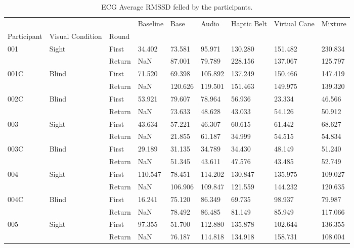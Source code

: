 
\begin{table}[!htb]
\centering
\caption{ECG Average RMSSD felled by the participants.}
\label{tab:ecg_rmssd_table}
\begin{tabular}{lllllllll}
\toprule
    &       &        &  Baseline &    Base &   Audio &  Haptic Belt &  Virtual Cane &  Mixture \\
Participant & Visual Condition & Round &           &         &         &              &               &          \\
\midrule
001 & Sight & First &    34.402 &  73.581 &  95.971 &      130.280 &       151.482 &  230.834 \\
    &       & Return &       NaN &  87.001 &  79.789 &      228.156 &       137.067 &  125.797 \\
001C & Blind & First &    71.520 &  69.398 & 105.892 &      137.249 &       150.466 &  147.419 \\
    &       & Return &       NaN & 120.626 & 119.501 &      151.463 &       149.975 &  139.320 \\
002C & Blind & First &    53.921 &  79.607 &  78.964 &       56.936 &        23.334 &   46.566 \\
    &       & Return &       NaN &  73.633 &  48.628 &       43.033 &        54.126 &   50.912 \\
003 & Sight & First &    43.634 &  57.221 &  46.307 &       60.615 &        61.442 &   68.627 \\
    &       & Return &       NaN &  21.855 &  61.187 &       34.999 &        54.515 &   54.834 \\
003C & Blind & First &    29.189 &  31.135 &  34.789 &       34.430 &        48.149 &   51.240 \\
    &       & Return &       NaN &  51.345 &  43.611 &       47.576 &        43.485 &   52.749 \\
004 & Sight & First &   110.547 &  78.451 & 114.202 &      130.847 &       135.975 &  109.027 \\
    &       & Return &       NaN & 106.906 & 109.847 &      121.559 &       144.232 &  120.635 \\
004C & Blind & First &    16.241 &  75.120 &  86.349 &       69.735 &        98.937 &   79.987 \\
    &       & Return &       NaN &  78.492 &  86.485 &       81.149 &        85.949 &  117.066 \\
005 & Sight & First &    97.355 &  51.700 & 112.880 &      135.878 &       102.644 &  136.355 \\
    &       & Return &       NaN &  76.187 & 114.818 &      134.918 &       158.731 &  108.004 \\
\bottomrule
\end{tabular}
\end{table}

